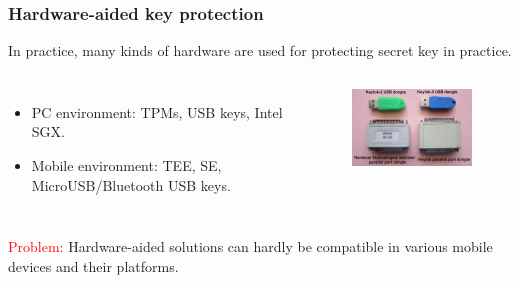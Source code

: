 \documentclass{beamer}
\begin{document}
\frame
{
\frametitle{Hardware-aided key protection}
In practice, many kinds of hardware are used for protecting secret key in practice.
\begin{columns}[c]
\begin{itemize}
\setlength{\itemsep}{12pt}
\item PC environment: TPMs, USB keys, Intel SGX.
\item Mobile environment: TEE, SE, MicroUSB/Bluetooth USB keys.
\end{itemize}
\begin{figure}[htbp]
\centering
  \includegraphics[width=4.8cm]{./pics/dongles.jpg}
\end{figure}
\end{columns}


\textcolor{red}{Problem:} Hardware-aided solutions can hardly be compatible in various mobile devices and their platforms.
}
\end{document}
